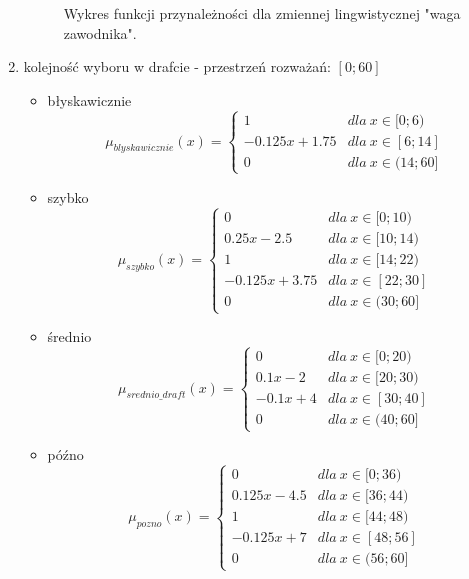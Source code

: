 \documentclass{classrep}
\begin{document}
\begin{enumerate}
\begin{figure}[H]
        \caption{Wykres funkcji przynależności dla zmiennej lingwistycznej "waga zawodnika".}
        \label{rysunek:waga}
    \end{figure}
    
    \item kolejność wyboru w drafcie - przestrzeń rozważań: $[0;60]$
    \begin{itemize}
        \item błyskawicznie
        \begin{equation}
            \mu_{blyskawicznie}(x) = \left\{\begin{matrix} 1 & dla \: x\in[0;6) \\ -0.125x + 1.75 & dla \: x\in [6; 14] \\ 0 & dla \: x\in (14;60] \end{matrix}\right.
        \end{equation}
         \item szybko
        \begin{equation}
            \mu_{szybko}(x) = \left\{\begin{matrix} 0 & dla \: x\in [0;10) \\ 0.25x - 2.5 & dla \: x\in[10;14) \\ 1 & dla \: x\in [14;22) \\ -0.125x + 3.75 & dla \: x\in [22; 30]\\ 0 & dla \: x\in (30;60] \end{matrix}\right.
        \end{equation}
        \item średnio
        \begin{equation}
            \mu_{srednio\_draft}(x) = \left\{\begin{matrix} 0 & dla \: x\in [0;20) \\ 0.1x - 2 & dla \: x\in[20;30) \\ -0.1x + 4 & dla \: x\in [30; 40]\\ 0 & dla \: x\in (40;60] \end{matrix}\right.
        \end{equation}
        \item późno
        \begin{equation}
            \mu_{pozno}(x) = \left\{\begin{matrix} 0 & dla \: x\in [0;36) \\ 0.125x - 4.5 & dla \: x\in[36;44) \\ 1 & dla \: x\in [44;48) \\ -0.125x + 7 & dla \: x\in [48; 56] \\ 0 & dla \: x\in (56;60] \end{matrix}\right.

\end{equation}
\end{itemize}
\end{enumerate}
\end{document}
